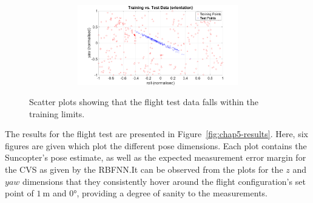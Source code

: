 \begin{figure}
\begin{subfigure}{\textwidth}
\begin{subfigure}{0.48\textwidth}
    \end{subfigure}
    \begin{subfigure}{0.48\textwidth}
      \includegraphics[clip, trim = 80 0 100 0, width=\textwidth]{figures/chapter5/trts_rollyaw}
    \end{subfigure}
    \caption{}
  \end{subfigure}
  \caption[Scatter plots of flight data vs.\ training data. ]{Scatter plots showing that the flight test data falls within the training limits. }
\label{fig:chap5-ts-tr-scatter}
\end{figure}

The results for the flight test are presented in Figure~\ref{fig:chap5-results}. Here, six figures are given which plot the different pose dimensions. Each plot contains the Suncopter's pose estimate, as well as the expected measurement error margin for the CVS as given by the RBFNN.\@ It can be observed from the plots for the $z$ and $yaw$ dimensions that they consistently hover around the flight configuration's set point of $\SI{1}{\m}$ and $\ang{0}$, providing a degree of sanity to the measurements. 
  
